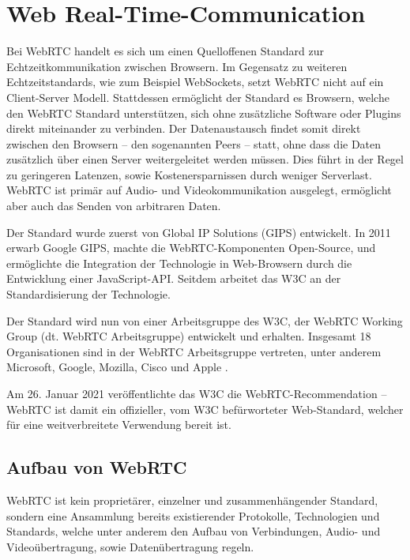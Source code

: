 \section{Web Real-Time-Communication}
Bei \ac{WebRTC} handelt es sich um einen Quelloffenen Standard zur Echtzeitkommunikation zwischen Browsern. Im Gegensatz zu weiteren Echtzeitstandards, wie zum Beispiel WebSockets, setzt \acs{WebRTC} nicht auf ein Client-Server Modell. Stattdessen ermöglicht der Standard es Browsern, welche den \acs{WebRTC} Standard unterstützen, sich ohne zusätzliche Software oder Plugins direkt miteinander zu verbinden. Der Datenaustausch findet somit direkt zwischen den Browsern -- den sogenannten Peers -- statt, ohne dass die Daten zusätzlich über einen Server weitergeleitet werden müssen. Dies führt in der Regel zu geringeren Latenzen, sowie Kostenersparnissen durch weniger Serverlast. WebRTC ist primär auf Audio- und Videokommunikation ausgelegt, ermöglicht aber auch das Senden von arbitraren Daten.\par

Der Standard wurde zuerst von Global IP Solutions (GIPS) entwickelt. In 2011 erwarb Google GIPS, machte die \acs{WebRTC}-Komponenten Open-Source, und ermöglichte die Integration der Technologie in Web-Browsern durch die Entwicklung einer JavaScript-\acs{API}. Seitdem arbeitet das \acs{W3C} an der Standardisierung der Technologie.

Der Standard wird nun von einer Arbeitsgruppe des \acs{W3C}, der \acs{WebRTC} Working Group (dt. WebRTC Arbeitsgruppe) entwickelt und erhalten. Insgesamt 18 Organisationen sind in der WebRTC Arbeitsgruppe vertreten, unter anderem Microsoft, Google, Mozilla, Cisco und Apple \cite{webRTCWorkingGroup}.\par

Am 26. Januar 2021 veröffentlichte das \acs{W3C} die \acs{WebRTC}-Recommendation -- \acs{WebRTC} ist damit ein offizieller, vom \acs{W3C} befürworteter Web-Standard, welcher für eine weitverbreitete Verwendung bereit ist. 

\subsection{Aufbau von WebRTC}
WebRTC ist kein proprietärer, einzelner und zusammenhängender Standard, sondern eine Ansammlung bereits existierender Protokolle, Technologien und Standards, welche unter anderem den Aufbau von Verbindungen, Audio- und Videoübertragung, sowie Datenübertragung regeln.\par

